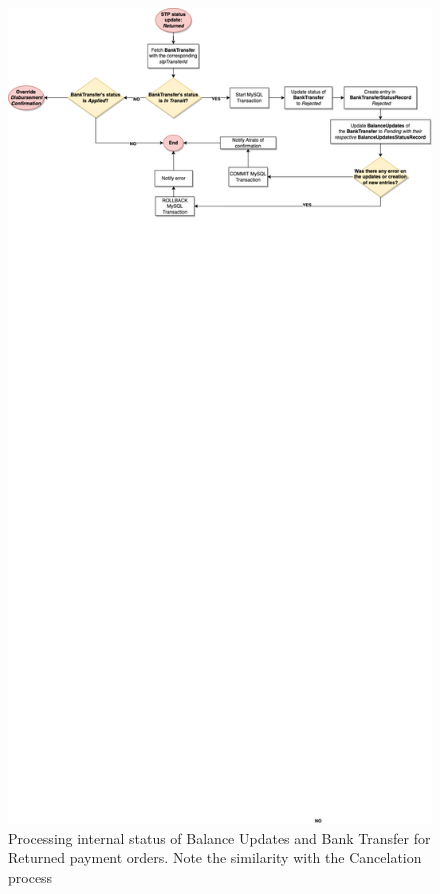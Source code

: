 \begin{figure} [h]
    \centering
    \includegraphics[scale = 0.4]{assets/diagrams/ReturnedStatusUpdate.png}
    \caption{Processing internal status of Balance Updates and Bank Transfer for Returned payment orders. Note the similarity with the Cancelation process}\label{fig:returned_status_update}
\end{figure}

